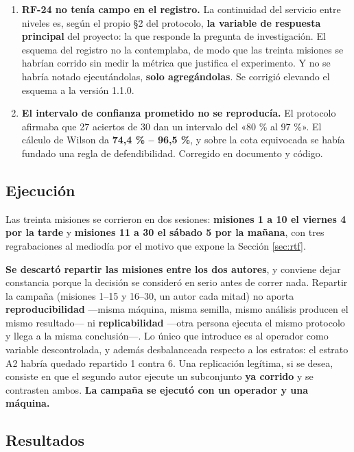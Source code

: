 \documentclass[12pt,letterpaper]{article}
\begin{document}
\begin{enumerate}[leftmargin=*]
    \item \textbf{RF-24 no tenía campo en el registro.} La continuidad del servicio entre niveles es, según el propio \S 2 del protocolo, \textbf{la variable de respuesta principal} del proyecto: la que responde la pregunta de investigación. El esquema del registro no la contemplaba, de modo que las treinta misiones se habrían corrido sin medir la métrica que justifica el experimento. Y no se habría notado ejecutándolas, \textbf{solo agregándolas}. Se corrigió elevando el esquema a la versión 1.1.0.
    \item \textbf{El intervalo de confianza prometido no se reproducía.} El protocolo afirmaba que 27 aciertos de 30 dan un intervalo del «80 \% al 97 \%». El cálculo de Wilson da \textbf{74,4 \% -- 96,5 \%}, y sobre la cota equivocada se había fundado una regla de defendibilidad. Corregido en documento y código.
\end{enumerate}

\subsection{Ejecución}

Las treinta misiones se corrieron en dos sesiones: \textbf{misiones 1 a 10 el viernes 4 por la tarde} y \textbf{misiones 11 a 30 el sábado 5 por la mañana}, con tres regrabaciones al mediodía por el motivo que expone la Sección \ref{sec:rtf}.

\textbf{Se descartó repartir las misiones entre los dos autores}, y conviene dejar constancia porque la decisión se consideró en serio antes de correr nada. Repartir la campaña (misiones 1--15 y 16--30, un autor cada mitad) no aporta \textbf{reproducibilidad} ---misma máquina, misma semilla, mismo análisis producen el mismo resultado--- ni \textbf{replicabilidad} ---otra persona ejecuta el mismo protocolo y llega a la misma conclusión---. Lo único que introduce es al operador como variable descontrolada, y además desbalanceada respecto a los estratos: el estrato A2 habría quedado repartido 1 contra 6. Una replicación legítima, si se desea, consiste en que el segundo autor ejecute un subconjunto \textbf{ya corrido} y se contrasten ambos. \textbf{La campaña se ejecutó con un operador y una máquina.}

\subsection{Resultados}
\end{document}
